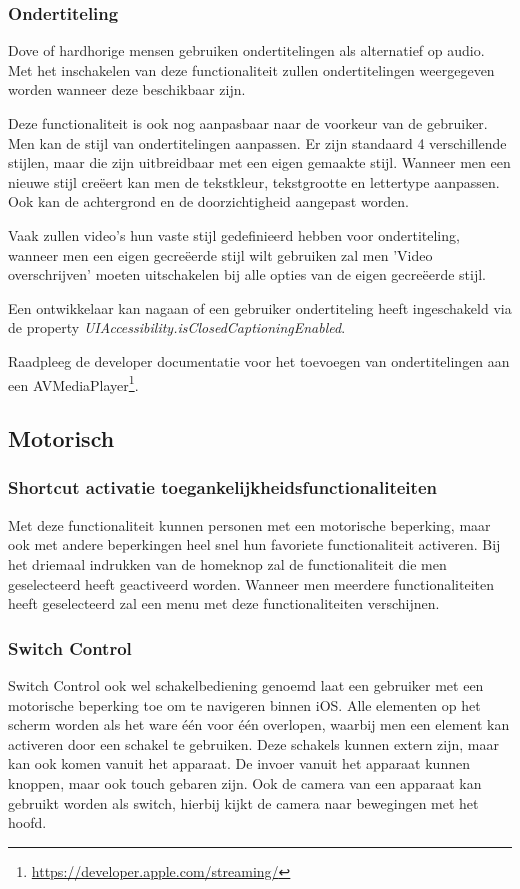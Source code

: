 \subsubsection{Ondertiteling}
\label{subsec:ondertiteliOS}
Dove of hardhorige mensen gebruiken ondertitelingen als alternatief op audio. Met het inschakelen van deze functionaliteit zullen ondertitelingen weergegeven worden wanneer deze beschikbaar zijn.

Deze functionaliteit is ook nog aanpasbaar naar de voorkeur van de gebruiker. Men kan de stijl van ondertitelingen aanpassen. Er zijn standaard 4 verschillende stijlen, maar die zijn uitbreidbaar met een eigen gemaakte stijl. Wanneer men een nieuwe stijl creëert kan men de tekstkleur, tekstgrootte en lettertype aanpassen. Ook kan de achtergrond en de doorzichtigheid aangepast worden. 

Vaak zullen video's hun vaste stijl gedefinieerd hebben voor ondertiteling, wanneer men een eigen gecreëerde stijl wilt gebruiken zal men  'Video overschrijven' moeten uitschakelen bij alle opties van de eigen gecreëerde stijl.

Een ontwikkelaar kan nagaan of een gebruiker ondertiteling heeft ingeschakeld via de property \emph{UIAccessibility.isClosedCaptioningEnabled}.

Raadpleeg de developer documentatie voor het toevoegen van ondertitelingen aan een AVMediaPlayer\footnote{\url{https://developer.apple.com/streaming/}}.
\subsection{Motorisch}
\subsubsection{Shortcut activatie toegankelijkheidsfunctionaliteiten}
Met deze functionaliteit kunnen personen met een motorische beperking, maar ook met andere beperkingen heel snel hun favoriete functionaliteit activeren. Bij het driemaal indrukken van de homeknop zal de functionaliteit die men geselecteerd heeft geactiveerd worden. Wanneer men meerdere functionaliteiten heeft geselecteerd zal een menu met deze functionaliteiten verschijnen.
\subsubsection{Switch Control}
Switch Control ook wel schakelbediening genoemd laat een gebruiker met een motorische beperking toe om te navigeren binnen iOS. Alle elementen op het scherm worden als het ware één voor één overlopen, waarbij men een element kan activeren door een schakel te gebruiken. Deze schakels kunnen extern zijn, maar kan ook komen vanuit het apparaat. De invoer vanuit het apparaat kunnen knoppen, maar ook touch gebaren zijn. Ook de camera van een apparaat kan gebruikt worden als switch, hierbij kijkt de camera naar bewegingen met het hoofd.

